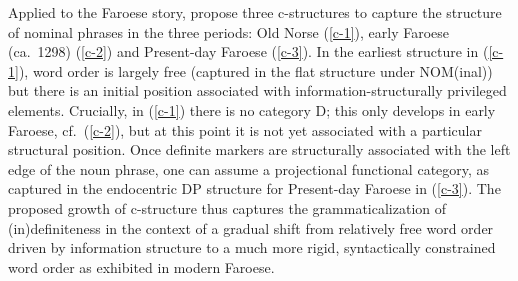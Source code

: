 \documentclass[output=paper,hidelinks]{langscibook}
\begin{document}
Applied to the Faroese story, \citet{Borjarsetal16} propose
three c-structures to capture the structure of nominal phrases in the three periods: Old Norse (\ref{c-1}), early Faroese (ca.~1298) (\ref{c-2}) and Present-day Faroese (\ref{c-3}). In the earliest structure in (\ref{c-1}),  word order is largely free (captured in the flat structure under NOM(inal)) but there is an initial position associated with information-structur\-ally privileged elements. Crucially, in (\ref{c-1}) there is no category D; this only develops in early Faroese, cf.~(\ref{c-2}), but at this point it is not yet associated with a particular structural position. Once definite markers are structurally associated with the left edge of the noun phrase, one can assume a projectional functional category, as captured in the endocentric DP structure for Present-day Faroese in (\ref{c-3}). The proposed growth of c-structure thus captures the grammaticalization of (in)definiteness in the context of a gradual shift from relatively free word order driven by information structure to a much more rigid, syntactically constrained word order as exhibited in modern Faroese.
\end{document}

